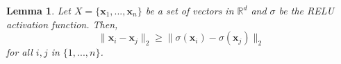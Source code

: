 \documentclass{article}
\newtheorem{lemma}{Lemma}
\newcommand{\R}{\mathbb{R}}
\newcommand{\ltwo}[1]{\lVert {#1} \rVert_2}
\newcommand{\x}{\mathbf{x}}
\begin{document}
\begin{lemma}
    Let $X=\{\x_1,...,\x_n\}$ be a set of vectors in $\R^d$ and $\sigma$ be the RELU activation function.
    Then,
    \begin{equation}
        \ltwo{\x_i-\x_j} \ge \ltwo{\sigma(\x_i)-\sigma(\x_j)}
    \end{equation}
    for all $i,j$ in $\{1,...,n\}$.
\end{lemma}



\end{document}
